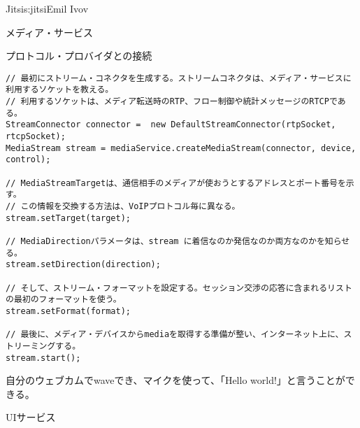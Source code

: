 \begin{aosachapter}{Jitsi}{s:jitsi}{Emil Ivov}
\begin{aosasect1}{メディア・サービス}
\begin{aosasect2}{プロトコル・プロバイダとの接続}



\begin{verbatim}
// 最初にストリーム・コネクタを生成する。ストリームコネクタは、メディア・サービスに利用するソケットを教える。
// 利用するソケットは、メディア転送時のRTP、フロー制御や統計メッセージのRTCPである。
StreamConnector connector =  new DefaultStreamConnector(rtpSocket, rtcpSocket);
MediaStream stream = mediaService.createMediaStream(connector, device, control);

// MediaStreamTargetは、通信相手のメディアが使おうとするアドレスとポート番号を示す。
// この情報を交換する方法は、VoIPプロトコル毎に異なる。
stream.setTarget(target);

// MediaDirectionパラメータは、stream に着信なのか発信なのか両方なのかを知らせる。
stream.setDirection(direction);

// そして、ストリーム・フォーマットを設定する。セッション交渉の応答に含まれるリストの最初のフォーマットを使う。
stream.setFormat(format);

// 最後に、メディア・デバイスからmediaを取得する準備が整い、インターネット上に、ストリーミングする。
stream.start();
\end{verbatim}

\noindent 自分のウェブカムでwaveでき、マイクを使って、「Hello world!」と言うことができる。

\end{aosasect2}

\end{aosasect1}

\begin{aosasect1}{UIサービス}


\end{aosasect1}
\end{aosachapter}
